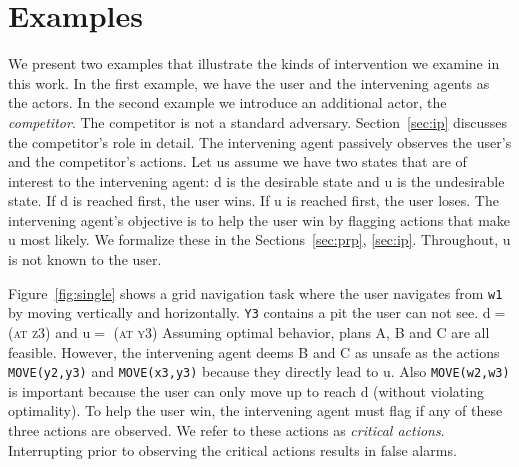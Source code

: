 \documentclass[letterpaper]{article}
\theoremstyle{plain}
\begin{document}
\section{Examples}
\label{sec:example}

We present two examples that illustrate the kinds of intervention we examine in this work. In the first example, we have the user and the intervening agents as the actors. In the second example we introduce an additional actor, the \textit{competitor}. The competitor is not a standard adversary. Section~\ref{sec:ip} discusses the competitor's role in detail.
The intervening agent passively observes the user's and the competitor's actions. Let us assume we have two states that are of interest to the intervening agent: $\mathrm{d}$ is the desirable state and $\mathrm{u}$ is the undesirable state. If $\mathrm{d}$ is reached first, the user wins. If $\mathrm{u}$ is reached first, the user loses. The intervening agent's objective is to help the user win by flagging actions that make $\mathrm{u}$ most likely. We formalize these in the Sections~\ref{sec:prp}, \ref{sec:ip}. Throughout, $\mathrm{u}$ is not known to the user.

Figure~\ref{fig:single} shows a grid navigation task where the user navigates from \texttt{w1} by moving vertically and horizontally. \texttt{Y3} contains a pit the user can not see. $\mathrm{d}=$ \textsc{(at z3)} and $\mathrm{u}=$ \textsc{(at y3})
Assuming optimal behavior, plans A, B and C are all feasible. 
However, the intervening agent deems B and C as unsafe as the actions \texttt{MOVE(y2,y3)} and \texttt{MOVE(x3,y3)} because they directly lead to $\mathrm{u}$. Also \texttt{MOVE(w2,w3)} is important because the user can only move up to reach $\mathrm{d}$ (without violating optimality). To help the user win, the intervening agent must flag if any of these three actions are observed. We refer to these actions as \textit{critical actions}. Interrupting prior to observing the critical actions results in false alarms.
\end{document}

